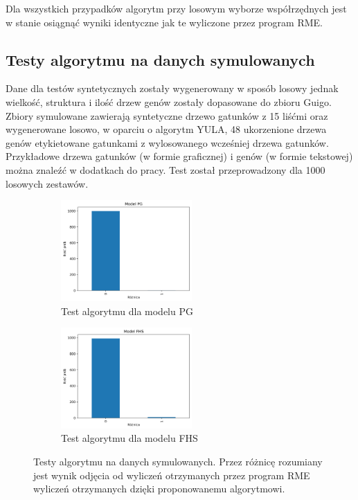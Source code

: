 \documentclass[licencjacka]{pracamgr}
\begin{document}
Dla wszystkich przypadków algorytm przy losowym wyborze współrzędnych jest w stanie osiągnąć wyniki identyczne jak te wyliczone przez program RME. 

\subsection{Testy algorytmu na danych symulowanych}
Dane dla testów syntetycznych zostały wygenerowany w sposób losowy jednak wielkość, struktura i ilość drzew genów zostały dopasowane do zbioru Guigo. Zbiory symulowane zawierają syntetyczne drzewo gatunków z 15 liśćmi oraz  wygenerowane losowo, w oparciu o algorytm YULA, 48 ukorzenione drzewa genów etykietowane gatunkami z wylosowanego wcześniej drzewa gatunków. Przykładowe drzewa gatunków (w formie graficznej) i genów (w formie tekstowej) można znaleźć w dodatkach do pracy. Test został przeprowadzony dla 1000 losowych zestawów.

\begin{figure}[H]
\centering
\begin{subfigure}{.5\textwidth}
  \centering
  \includegraphics[width=50mm]{./pictures/PG.png}
  \caption{Test algorytmu dla modelu PG}
\end{subfigure}%
\begin{subfigure}{.5\textwidth}
  \centering
  \includegraphics[width=50mm]{./pictures/FHS.png}
  \caption{Test algorytmu dla modelu FHS}
\end{subfigure}%
\caption{Testy algorytmu na danych symulowanych. Przez różnicę rozumiany jest wynik odjęcia od wyliczeń otrzymanych przez program RME wyliczeń otrzymanych dzięki proponowanemu algorytmowi. }
\end{figure}
\end{document}

